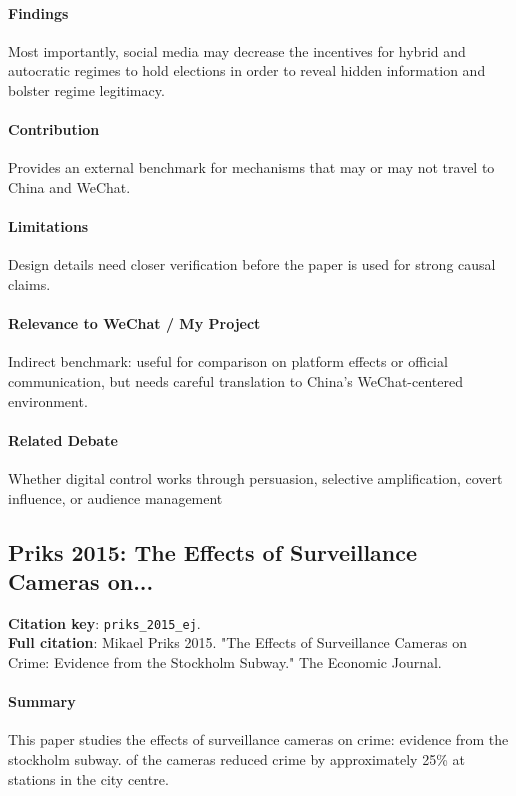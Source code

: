 \documentclass[12pt]{article}
\begin{document}
\paragraph{Findings} Most importantly, social media may decrease the incentives for hybrid and autocratic regimes to hold elections in order to reveal hidden information and bolster regime legitimacy.

\paragraph{Contribution} Provides an external benchmark for mechanisms that may or may not travel to China and WeChat.

\paragraph{Limitations} Design details need closer verification before the paper is used for strong causal claims.

\paragraph{Relevance to WeChat / My Project} Indirect benchmark: useful for comparison on platform effects or official communication, but needs careful translation to China's WeChat-centered environment.

\paragraph{Related Debate} Whether digital control works through persuasion, selective amplification, covert influence, or audience management


\subsection{Priks 2015: The Effects of Surveillance Cameras on...}
\textbf{Citation key}: \texttt{priks\_2015\_ej}.\\
\textbf{Full citation}: Mikael Priks 2015. "The Effects of Surveillance Cameras on Crime: Evidence from the Stockholm Subway." The Economic Journal.

\paragraph{Summary} This paper studies the effects of surveillance cameras on crime: evidence from the stockholm subway. of the cameras reduced crime by approximately 25\% at stations in the city centre.
\end{document}
